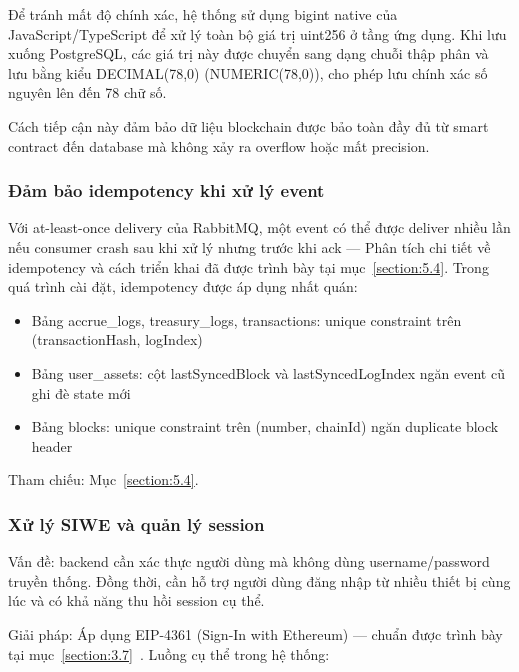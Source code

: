\documentclass[../DoAn.tex]{subfiles}
\begin{document}
Để tránh mất độ chính xác, hệ thống sử dụng bigint native của JavaScript/TypeScript để xử lý toàn bộ giá trị uint256 ở tầng ứng dụng. Khi lưu xuống PostgreSQL, các giá trị này được chuyển sang dạng chuỗi thập phân và lưu bằng kiểu DECIMAL(78,0) (NUMERIC(78,0)), cho phép lưu chính xác số nguyên lên đến 78 chữ số.

Cách tiếp cận này đảm bảo dữ liệu blockchain được bảo toàn đầy đủ từ smart contract đến database mà không xảy ra overflow hoặc mất precision.

\subsubsection{Đảm bảo idempotency khi xử lý event}
\label{section:6.2.3.b}


Với at-least-once delivery của RabbitMQ, một event có thể được deliver nhiều lần nếu consumer crash sau khi xử lý nhưng trước khi ack --- Phân tích chi tiết về idempotency và cách triển khai đã được trình bày tại mục~\ref{section:5.4}. Trong quá trình cài đặt, idempotency được áp dụng nhất quán:

\begin{itemize}
  \item Bảng accrue\_logs, treasury\_logs, transactions: unique constraint trên (transactionHash, logIndex)
  \item Bảng user\_assets: cột lastSyncedBlock và lastSyncedLogIndex ngăn event cũ ghi đè state mới
  \item Bảng blocks: unique constraint trên (number, chainId) ngăn duplicate block header
\end{itemize}


Tham chiếu: Mục~\ref{section:5.4}.

\subsubsection{Xử lý SIWE và quản lý session}
\label{section:6.2.3.d}


Vấn đề: backend cần xác thực người dùng mà không dùng username/password truyền thống. Đồng thời, cần hỗ trợ người dùng đăng nhập từ nhiều thiết bị cùng lúc và có khả năng thu hồi session cụ thể.

Giải pháp: Áp dụng EIP-4361 (Sign-In with Ethereum) --- chuẩn được trình bày tại mục~\ref{section:3.7}~\cite{EIP4361}. Luồng cụ thể trong hệ thống:
\end{document}
